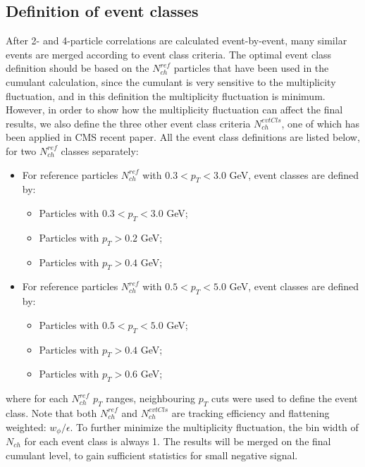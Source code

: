 \subsection{Definition of event classes}
After 2- and 4-particle correlations are calculated event-by-event, many similar events are merged according to event class criteria. The optimal event class definition should be based on the $N_{ch}^{ref}$ particles that have been used in the cumulant calculation, since the cumulant is very sensitive to the multiplicity fluctuation, and in this definition the multiplicity fluctuation is minimum. However, in order to show how the multiplicity fluctuation can affect the final results, we also define the three other event class criteria $N_{ch}^{evtCls}$, one of which has been applied in CMS recent paper. All the event class definitions are listed below, for two $N_{ch}^{ref}$ classes separately:
\begin{itemize}
\item For reference particles $N_{ch}^{ref}$ with $0.3<p_{T}<3.0$ GeV, event classes are defined by:
\begin{itemize}
\item Particles with $0.3<p_{T}<3.0$ GeV;
\item Particles with $p_{T}>0.2$ GeV;
\item Particles with $p_{T}>0.4$ GeV;
\end{itemize}
\item For reference particles $N_{ch}^{ref}$ with $0.5<p_{T}<5.0$ GeV, event classes are defined by:
\begin{itemize}
\item Particles with $0.5<p_{T}<5.0$ GeV;
\item Particles with $p_{T}>0.4$ GeV;
\item Particles with $p_{T}>0.6$ GeV;
\end{itemize}
\end{itemize}
where for each $N_{ch}^{ref}$ $p_{T}$ ranges, neighbouring $p_{T}$ cuts were used to define the event class. Note that both $N_{ch}^{ref}$ and $N_{ch}^{evtCls}$ are tracking efficiency and flattening weighted: $w_{\phi}/\epsilon$. To further minimize the multiplicity fluctuation, the bin width of $N_{ch}$ for each event class is always 1. The results will be merged on the final cumulant level, to gain sufficient statistics for small negative signal.

